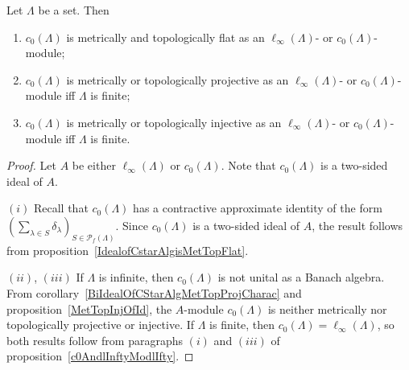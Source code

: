 \begin{proposition}\label{c0AndlInftyModc0} Let $\Lambda$ be a set. Then 

\begin{enumerate}[label = (\roman*)]
    \item $c_0(\Lambda)$ is metrically and topologically flat as
    an $\ell_\infty(\Lambda)$- or $c_0(\Lambda)$-module;

    \item $c_0(\Lambda)$ is metrically or topologically projective as
    an $\ell_\infty(\Lambda)$- or $c_0(\Lambda)$-module iff $\Lambda$ is finite;

    \item $c_0(\Lambda)$ is metrically or topologically injective as
    an $\ell_\infty(\Lambda)$- or $c_0(\Lambda)$-module iff $\Lambda$ is finite.
\end{enumerate}
\end{proposition}
\begin{proof} Let $A$ be either $\ell_\infty(\Lambda)$ or $c_0(\Lambda)$. Note
that $c_0(\Lambda)$ is a two-sided ideal of $A$. 

$(i)$ Recall that $c_0(\Lambda)$ has a contractive approximate identity of the
form ${(\sum_{\lambda\in S}\delta_\lambda)}_{S\in\mathcal{P}_{f}(\Lambda)}$. Since
$c_0(\Lambda)$ is a two-sided ideal of $A$, the result follows from
proposition~\ref{IdealofCstarAlgisMetTopFlat}.

$(ii)$, $(iii)$ If $\Lambda$ is infinite, then $c_0(\Lambda)$ is not unital as a 
Banach algebra. From corollary~\ref{BiIdealOfCStarAlgMetTopProjCharac} and
proposition~\ref{MetTopInjOfId}, the $A$-module $c_0(\Lambda)$ is neither
metrically nor topologically projective or injective. If $\Lambda$ is finite,
then $c_0(\Lambda)=\ell_\infty(\Lambda)$, so both results follow from paragraphs
$(i)$ and $(iii)$ of proposition~\ref{c0AndlInftyModlIfty}.
\end{proof}


